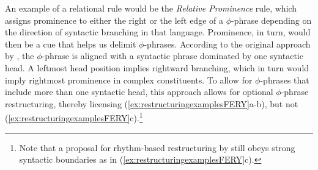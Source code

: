 An example of a relational rule would be the \textit{Relative Prominence} rule, which assigns prominence to either the right or the left edge of a $\phi$-phrase depending on the direction of syntactic branching in that language. Prominence, in turn, would then be a cue that helps us delimit $\phi$-phrases. According to the original approach by \citet{Nespor2007}, the $\phi$-phrase is aligned with a syntactic phrase dominated by one syntactic head. A leftmost head position implies rightward branching, which in turn would imply rightmost prominence in complex constituents. To allow for $\phi$-phrases that include more than one syntactic head, this approach allows for optional $\phi$-phrase restructuring, thereby 
licensing (\ref{ex:restructuringexamplesFERY}a-b), but not 
(\ref{ex:restructuringexamplesFERY}c).\footnote{Note that a proposal for rhythm-based restructuring by \citet{Ghini.1993} still obeys strong syntactic boundaries as in (\ref{ex:restructuringexamplesFERY}c).}



